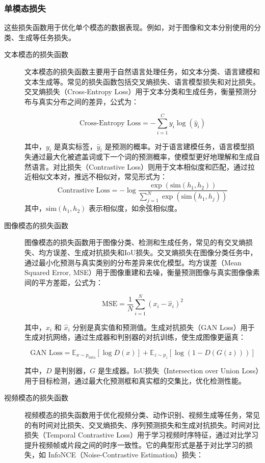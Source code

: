 \documentclass[12pt]{article}
\begin{document}
\subsubsection{单模态损失}
这些损失函数用于优化单个模态的数据表现。例如，对于图像和文本分别使用的分类、生成等任务损失。
\begin{description}
    \item[文本模态的损失函数] 文本模态的损失函数主要用于自然语言处理任务，如文本分类、语言建模和文本生成等。常见的损失函数包括交叉熵损失、语言模型损失和对比损失。交叉熵损失（Cross-Entropy Loss）用于文本分类和生成任务，衡量预测分布与真实分布之间的差异，公式为：
    
  \[
\text{Cross-Entropy Loss} = -\sum_{i=1}^{C} y_i \log(\hat{y}_i)
\]


    其中，\( y_i \) 是真实标签，\( \hat{y}_i \) 是预测的概率。对于语言建模任务，语言模型损失通过最大化被遮盖词或下一个词的预测概率，使模型更好地理解和生成自然语言。对比损失（Contrastive Loss）则用于文本相似度和匹配，通过拉近相似文本对，推远不相似对，常见形式为：
    \[
\text{Contrastive Loss} = -\log \frac{\exp(\text{sim}(h_1, h_2))}{\sum_{j=1}^{N} \exp(\text{sim}(h_1, h_j))}
\]
其中，\( \text{sim}(h_1, h_2) \) 表示相似度，如余弦相似度。
    \item[图像模态的损失函数] 
    
图像模态的损失函数用于图像分类、检测和生成任务，常见的有交叉熵损失、均方误差、生成对抗损失和IoU损失。交叉熵损失在图像分类任务中，通过最小化预测与真实类别的分布差异来优化模型。均方误差（Mean Squared Error, MSE）用于图像重建和去噪，衡量预测图像与真实图像像素间的平方差距，公式为：

\[
\text{MSE} = \frac{1}{N} \sum_{i=1}^{N} (x_i - \hat{x}_i)^2
\]

其中，\( x_i \) 和 \( \hat{x}_i \) 分别是真实值和预测值。生成对抗损失（GAN Loss）用于生成对抗网络，通过生成器和判别器的对抗训练，使生成图像更逼真：

\[
\text{GAN Loss} = \mathbb{E}_{x \sim p_{\text{data}}}[\log D(x)] + \mathbb{E}_{z \sim p_z}[\log (1 - D(G(z)))]
\]

其中，\( D \) 是判别器，\( G \) 是生成器。IoU损失（Intersection over Union Loss）用于目标检测，通过最大化预测框和真实框的交集比，优化检测性能。



    \item[视频模态的损失函数] 视频模态的损失函数用于优化视频分类、动作识别、视频生成等任务，常见的有时间对比损失、交叉熵损失、序列预测损失和生成对抗损失。时间对比损失（Temporal Contrastive Loss）用于学习视频时序特征，通过对比学习提升视频帧或片段之间的时序一致性。它的典型形式是基于对比学习的损失，如 InfoNCE（Noise-Contrastive Estimation）损失：


\end{description}
\end{document}
